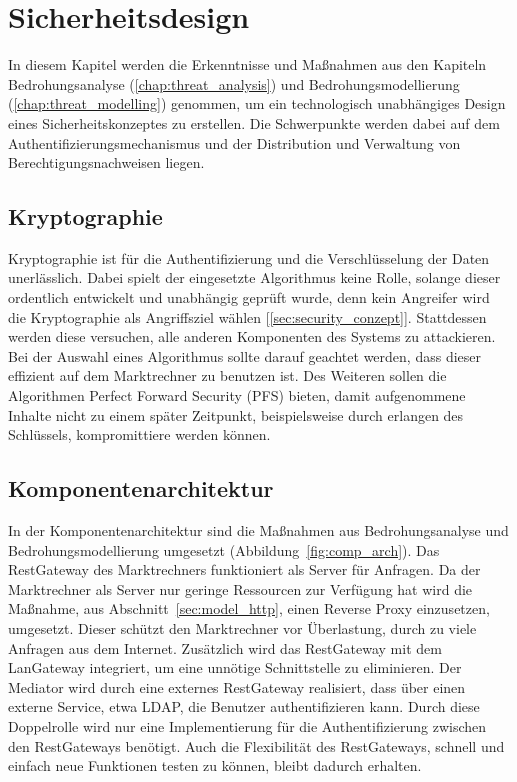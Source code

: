 \documentclass[11pt,a4paper]{report}
\begin{document}
\chapter{Sicherheitsdesign} \label{chap:design}

In diesem Kapitel werden die Erkenntnisse und Maßnahmen aus den Kapiteln Bedrohungsanalyse (\ref{chap:threat_analysis}) und Bedrohungsmodellierung (\ref{chap:threat_modelling}) genommen, um ein technologisch unabhängiges Design eines Sicherheitskonzeptes zu erstellen. Die Schwerpunkte werden dabei auf dem Authentifizierungsmechanismus und der Distribution und Verwaltung von Berechtigungsnachweisen liegen.

\section{Kryptographie}

Kryptographie ist für die Authentifizierung und die Verschlüsselung der Daten unerlässlich. Dabei spielt der eingesetzte Algorithmus keine Rolle, solange dieser ordentlich entwickelt und unabhängig geprüft wurde, denn kein Angreifer wird die Kryptographie als Angriffsziel wählen [\ref{sec:security_conzept}]. Stattdessen werden diese versuchen, alle anderen Komponenten des Systems zu attackieren. Bei der Auswahl eines Algorithmus sollte darauf geachtet werden, dass dieser effizient auf dem Marktrechner zu benutzen ist. Des Weiteren sollen die Algorithmen Perfect Forward Security (PFS) bieten, damit aufgenommene Inhalte nicht zu einem später Zeitpunkt, beispielsweise durch erlangen des Schlüssels, kompromittiere werden können. 

\section{Komponentenarchitektur}

In der Komponentenarchitektur sind die Maßnahmen aus Bedrohungsanalyse und Bedrohungsmodellierung umgesetzt (Abbildung~\ref{fig:comp_arch}). Das RestGateway des Marktrechners funktioniert als Server für Anfragen. Da der Marktrechner als Server nur geringe Ressourcen zur Verfügung hat wird die Maßnahme, aus Abschnitt~\ref{sec:model_http}, einen Reverse Proxy einzusetzen, umgesetzt. Dieser schützt den Marktrechner vor Überlastung, durch zu viele Anfragen aus dem Internet. Zusätzlich wird das RestGateway mit dem LanGateway integriert, um eine unnötige Schnittstelle zu eliminieren. Der Mediator wird durch eine externes RestGateway realisiert, dass über einen externe Service, etwa LDAP, die Benutzer authentifizieren kann. Durch diese Doppelrolle wird nur eine Implementierung für die Authentifizierung zwischen den RestGateways benötigt. Auch die Flexibilität des RestGateways, schnell und einfach neue Funktionen testen zu können, bleibt dadurch erhalten. 
\end{document}
